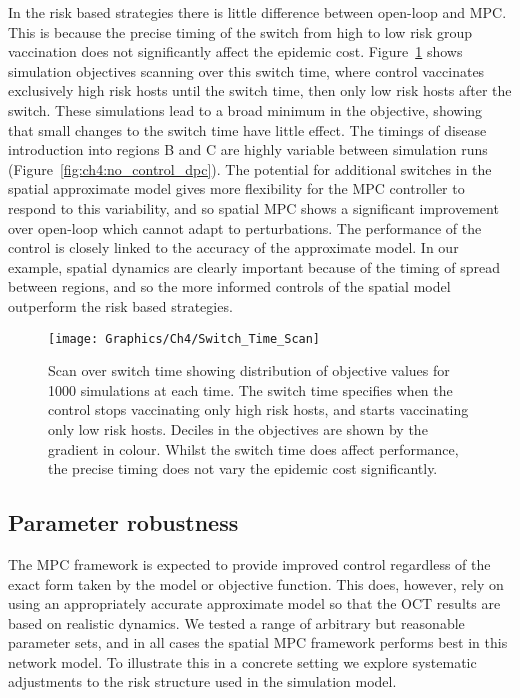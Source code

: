 In the risk based strategies there is little difference between open-loop and MPC\@. This is because the precise timing of the switch from high to low risk group vaccination does not significantly affect the epidemic cost. Figure~\ref{fig:ch4:switch_time_scan} shows simulation objectives scanning over this switch time, where control vaccinates exclusively high risk hosts until the switch time, then only low risk hosts after the switch. These simulations lead to a broad minimum in the objective, showing that small changes to the switch time have little effect. The timings of disease introduction into regions B and C are highly variable between simulation runs (Figure~\ref{fig:ch4:no_control_dpc}). The potential for additional switches in the spatial approximate model gives more flexibility for the MPC controller to respond to this variability, and so spatial MPC shows a significant improvement over open-loop which cannot adapt to perturbations. The performance of the control is closely linked to the accuracy of the approximate model. In our example, spatial dynamics are clearly important because of the timing of spread between regions, and so the more informed controls of the spatial model outperform the risk based strategies.

\begin{figure}[h]
    \begin{center}
        \texttt{[image: Graphics/Ch4/Switch\_Time\_Scan]}
        \caption[Effect of switch time on strategy performance]{Scan over switch time showing distribution of objective values for 1000 simulations at each time. The switch time specifies when the control stops vaccinating only high risk hosts, and starts vaccinating only low risk hosts. Deciles in the objectives are shown by the gradient in colour. Whilst the switch time does affect performance, the precise timing does not vary the epidemic cost significantly.}
        \label{fig:ch4:switch_time_scan}
    \end{center}
\end{figure}

\FloatBarrier

\subsection{Parameter robustness\label{sec:ch4:Results_ParameterRobustness}}

The MPC framework is expected to provide improved control regardless of the exact form taken by the model or objective function. This does, however, rely on using an appropriately accurate approximate model so that the OCT results are based on realistic dynamics. We tested a range of arbitrary but reasonable parameter sets, and in all cases the spatial MPC framework performs best in this network model. To illustrate this in a concrete setting we explore systematic adjustments to the risk structure used in the simulation model.

